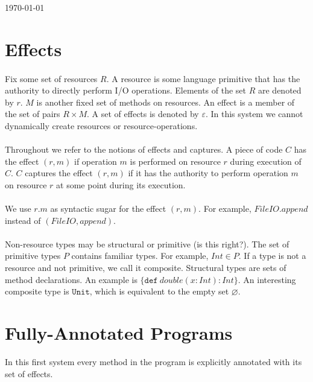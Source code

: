 \documentclass{llncs}
\newcommand{\keywadj}[1]{\mathtt{#1}}
\newcommand{\keyw}[1]{\keywadj{#1}~}
\begin{document}
\today
\section{Effects}

\paragraph{}
Fix some set of resources $R$. A resource is some language primitive that has the authority to directly perform I/O operations. Elements of the set $R$ are denoted by $r$. $M$ is another fixed set of methods on resources. An effect is a member of the set of pairs $R \times M$. A set of effects is denoted by $\varepsilon$. In this system we cannot dynamically create resources or resource-operations.

\paragraph{}
Throughout we refer to the notions of effects and captures. A piece of code $C$ has the effect $(r, m)$ if operation $m$ is performed on resource $r$ during execution of $C$. $C$ captures the effect $(r, m)$ if it has the authority to perform operation $m$ on resource $r$ at some point during its execution.

\paragraph{}
We use $r.m$ as syntactic sugar for the effect $(r,m)$. For example, $FileIO.append$ instead of $(FileIO, append)$.

\paragraph{}
Non-resource types may be structural or primitive (is this right?). The set of primitive types $P$ contains familiar types. For example, $Int \in P$. If a type is not a resource and not primitive, we call it composite. Structural types are sets of method declarations. An example is $\{ \keyw{def} double(x : Int) : Int \}$. An interesting composite type is $\keywadj{Unit}$, which is equivalent to the empty set $\varnothing$.

\section{Fully-Annotated Programs}

In this first system every method in the program is explicitly annotated with its set of effects.
\end{document}
